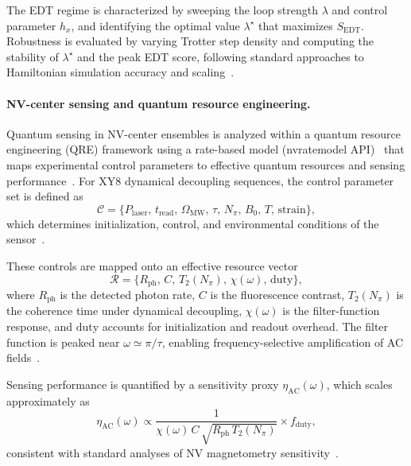 \documentclass[twocolumn,10pt]{article}
\begin{document}
The EDT regime is characterized by sweeping the loop strength $\lambda$ and control parameter $h_x$, and identifying the optimal value $\lambda^\star$ that maximizes $S_{\mathrm{EDT}}$. Robustness is evaluated by varying Trotter step density and computing the stability of $\lambda^\star$ and the peak EDT score, following standard approaches to Hamiltonian simulation accuracy and scaling~\cite{Childs2019}.

\paragraph*{NV-center sensing and quantum resource engineering.}

Quantum sensing in NV-center ensembles is analyzed within a quantum resource engineering (QRE) framework using a rate-based model (nvratemodel API)~\cite{NVRateModel2023} that maps experimental control parameters to effective quantum resources and sensing performance~\cite{Degen2017,Barry2020}. For XY8 dynamical decoupling sequences, the control parameter set is defined as
\begin{equation}
\mathcal{C} = \{P_{\mathrm{laser}},\, t_{\mathrm{read}},\, \Omega_{\mathrm{MW}},\, \tau,\, N_{\pi},\, B_0,\, T,\, \mathrm{strain}\},
\end{equation}
which determines initialization, control, and environmental conditions of the sensor~\cite{Casola2018}.

These controls are mapped onto an effective resource vector
\begin{equation}
\mathcal{R} = \{R_{\mathrm{ph}},\, C,\, T_2(N_{\pi}),\, \chi(\omega),\, \mathrm{duty}\},
\end{equation}
where $R_{\mathrm{ph}}$ is the detected photon rate, $C$ is the fluorescence contrast, $T_2(N_{\pi})$ is the coherence time under dynamical decoupling, $\chi(\omega)$ is the filter-function response, and $\mathrm{duty}$ accounts for initialization and readout overhead. The filter function is peaked near $\omega \simeq \pi/\tau$, enabling frequency-selective amplification of AC fields~\cite{Cywinski2008}.

Sensing performance is quantified by a sensitivity proxy $\eta_{\mathrm{AC}}(\omega)$, which scales approximately as
\begin{equation}
\eta_{\mathrm{AC}}(\omega) \propto \frac{1}{\chi(\omega)\,C\,\sqrt{R_{\mathrm{ph}}\,T_2(N_{\pi})}} \times f_{\mathrm{duty}},
\end{equation}
consistent with standard analyses of NV magnetometry sensitivity~\cite{Degen2017,Barry2020}.
\end{document}
